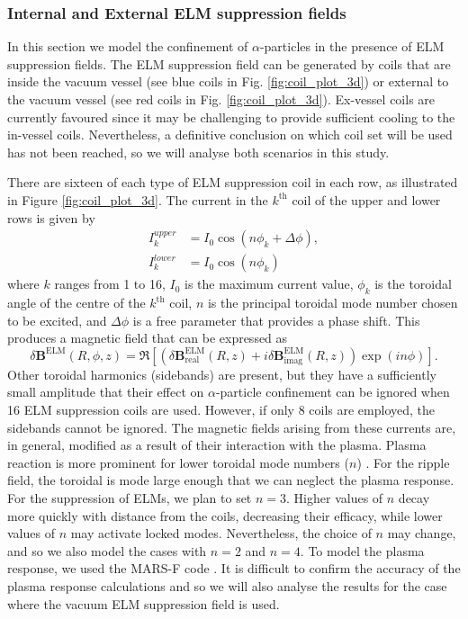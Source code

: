 \documentclass[10pt, a4paper, twoside]{article}
\begin{document}
\newpage
\subsubsection{Internal and External ELM suppression fields}
\label{sec:elm_suppression_field}

In this section we model the confinement of $\alpha$-particles in the presence of ELM suppression fields.
The ELM suppression field can be generated by coils that are inside the vacuum vessel (see blue coils in Fig. \ref{fig:coil_plot_3d}) or external to the vacuum vessel (see red coils in Fig. \ref{fig:coil_plot_3d}). Ex-vessel coils are currently favoured since it may be challenging to provide sufficient cooling to the in-vessel coils. Nevertheless, a definitive conclusion on which coil set will be used has not been reached, so we will analyse both scenarios in this study.

There are sixteen of each type of ELM suppression coil in each row, as illustrated in Figure \ref{fig:coil_plot_3d}. The current in the $k^\text{th}$ coil of the upper and lower rows is given by
\begin{align}
    \label{eq:ELM_coilcurrent_profile_upper}
    I_k^{upper} &= I_0 \cos(n \phi_k + \Delta \phi), \\
    \label{eq:ELM_coilcurrent_profile_lower}
    I_k^{lower} &= I_0 \cos(n \phi_k)
\end{align}
where $k$ ranges from 1 to 16, $I_0$ is the maximum current value, $\phi_k$ is the toroidal angle of the centre of the $k^\text{th}$ coil, $n$ is the principal toroidal mode number chosen to be excited, and $\Delta \phi$ is a free parameter that provides a phase shift. This produces a magnetic field that can be expressed as
\begin{equation}
    \delta\textbf{B}^\text{ELM}(R, \phi, z)=\Re\left[\left(\delta\textbf{B}^\text{ELM}_\text{real}(R,z) + i\delta\textbf{B}^\text{ELM}_\text{imag}(R,z)\right)\exp(in\phi)\right].
\end{equation}
Other toroidal harmonics (sidebands) are present, but they have a sufficiently small amplitude that their effect on $\alpha$-particle confinement can be ignored when 16 ELM suppression coils are used. However, if only 8 coils are employed, the sidebands cannot be ignored. The magnetic fields arising from these currents are, in general, modified as a result of their interaction with the plasma. Plasma reaction is more prominent for lower toroidal mode numbers ($n$) \cite{mcclements2005}. For the ripple field, the toroidal is mode large enough that we can neglect the plasma response. For the suppression of ELMs, we plan to set $n=3$. Higher values of $n$ decay more quickly with distance from the coils, decreasing their efficacy, while lower values of $n$ may activate locked modes. Nevertheless, the choice of $n$ may change, and so we also model the cases with $n=2$ and $n=4$. To model the plasma response, we used the MARS-F code \cite{liu2015}. It is difficult to confirm the accuracy of the plasma response calculations and so we will also analyse the results for the case where the vacuum ELM suppression field is used.
\end{document}
